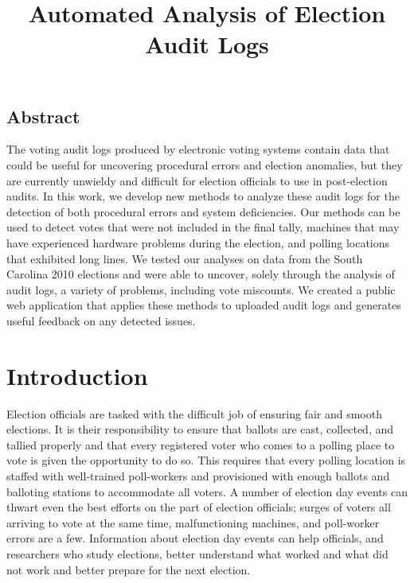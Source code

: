 \documentclass[letterpaper,twocolumn,10pt]{article}
\begin{document}
\date{}

\title{\Large \bf Automated Analysis of Election Audit Logs}

\author{
} %

\maketitle



\subsection*{Abstract}
The voting audit logs produced by electronic voting systems contain data
that could be useful for uncovering procedural errors and election anomalies,
but they 
are currently unwieldy and difficult for election officials to use in
post-election audits. In this work, we develop new methods to analyze these
audit logs for the detection of both procedural errors and system
deficiencies. Our methods can be used to detect votes that were not included in
the final tally, machines that may have experienced hardware problems during the
election, and polling locations that exhibited long lines. We tested our analyses on
data from the South Carolina 2010 elections and were able to uncover, solely
through the analysis of audit logs, a variety of problems, including vote
miscounts. We created a public web application that applies these methods to
uploaded audit logs and generates useful feedback on any detected issues.

 

\section{Introduction}
Election officials are tasked with the difficult job of ensuring fair
  and smooth elections. It is their responsibility to ensure that ballots are
  cast, collected, and tallied properly and that every registered voter who
  comes to a polling place to vote is given the opportunity to do so. This
  requires that every polling location is staffed with well-trained poll-workers
  and provisioned with enough ballots and balloting stations to accommodate all
  voters.  A number of election day events can thwart 
  even the best efforts on the part of election officials; surges of voters all
  arriving to vote at the same time, malfunctioning machines, and poll-worker
  errors are a few. Information about election day events can help officials,
  and researchers who study elections, better understand
  what worked and what did not work and better prepare for the next election.
\end{document}
